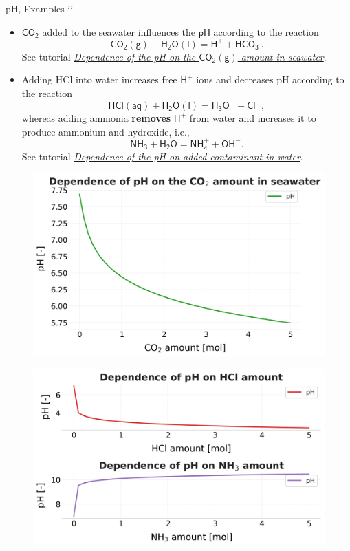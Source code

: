 %
\begin{frame}{pH, Examples \; ii}
\footnotesize
\lcol

\begin{itemize}
\item $\mathsf{CO_2}$ added to the seawater influences the $\mathsf{pH}$ according to the reaction
%
\[
\mathsf{CO_2(g) + H_2O(l) = H^+ + HCO_3^-.}
\]
% 
See tutorial \href{}{\textcolor{indigo(dye)}{\it Dependence of the pH on the $\mathsf{CO_2(g)}$ amount in seawater}}.
%
\pause
\vskip 10pt
\pause
\item Adding HCl into water increases free $\mathsf{H^+}$ ions and decreases pH according to the reaction 
%
\[
\mathsf{HCl(aq) + H_2O(l) = H_3O^+ + Cl^-,}
\]
%
whereas 
%
%
adding ammonia \textbf{removes} $\mathsf{H^+}$ from water and increases it to produce ammonium and hydroxide, i.e., 
%
\[
\mathsf{NH_3 + H_2O = NH_4^+ + OH^-.}
\]
%
%
% 
See tutorial \href{}{\textcolor{indigo(dye)}{\it Dependence of the pH on added contaminant in water}}.

\end{itemize}
%
\rcol
\begin{figure}
\centering
\includegraphics[width=0.82\columnwidth]{figures/chemical-equilibrium/ph-dependence-on-co2-amount-in-seawater.png}
\end{figure}
\vskip -10pt
\begin{figure}
\centering
\includegraphics[width=0.82\columnwidth]{figures/chemical-equilibrium/ph-dependence-on-contaminants-in-water.png}
\end{figure}
\ecol

\end{frame}



